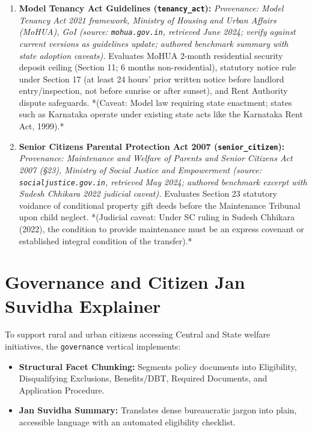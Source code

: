 \documentclass[12pt,a4paper,oneside]{report}
\begin{document}
\begin{enumerate}[itemsep=2pt]
    \item \textbf{Model Tenancy Act Guidelines (\texttt{tenancy\_act}):} \textit{Provenance: Model Tenancy Act 2021 framework, Ministry of Housing and Urban Affairs (MoHUA), GoI (source: \texttt{mohua.gov.in}, retrieved June 2024; verify against current versions as guidelines update; authored benchmark summary with state adoption caveats).} Evaluates MoHUA 2-month residential security deposit ceiling (Section 11; 6 months non-residential), statutory notice rule under Section 17 (at least 24 hours' prior written notice before landlord entry/inspection, not before sunrise or after sunset), and Rent Authority dispute safeguards. *(Caveat: Model law requiring state enactment; states such as Karnataka operate under existing state acts like the Karnataka Rent Act, 1999).*
    \item \textbf{Senior Citizens Parental Protection Act 2007 (\texttt{senior\_citizen}):} \textit{Provenance: Maintenance and Welfare of Parents and Senior Citizens Act 2007 (§23), Ministry of Social Justice and Empowerment (source: \texttt{socialjustice.gov.in}, retrieved May 2024; authored benchmark excerpt with Sudesh Chhikara 2022 judicial caveat).} Evaluates Section 23 statutory voidance of conditional property gift deeds before the Maintenance Tribunal upon child neglect. *(Judicial caveat: Under SC ruling in Sudesh Chhikara (2022), the condition to provide maintenance must be an express covenant or established integral condition of the transfer).*
\end{enumerate}

\section{Governance and Citizen Jan Suvidha Explainer}
To support rural and urban citizens accessing Central and State welfare initiatives, the \texttt{governance} vertical implements:
\begin{itemize}[itemsep=2pt]
    \item \textbf{Structural Facet Chunking:} Segments policy documents into Eligibility, Disqualifying Exclusions, Benefits/DBT, Required Documents, and Application Procedure.
    \item \textbf{Jan Suvidha Summary:} Translates dense bureaucratic jargon into plain, accessible language with an automated eligibility checklist.
\end{itemize}

\newpage

\end{document}

